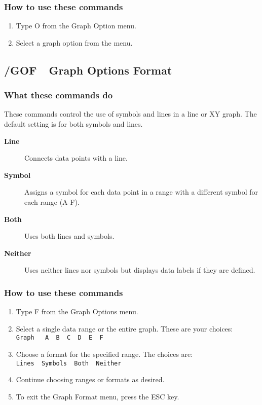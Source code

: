 \subsubsection*{How to use these commands}
\begin{enumerate}
\item{Type O from the Graph Option menu.}
\item{Select a graph option from the menu.}
\end{enumerate}
        
\subsection*{/GOF\ \     Graph Options Format}

\subsubsection*{What these commands do}
These commands control the use of symbols and lines in a line or XY 
graph.  The default setting is for both symbols and lines.
\begin{description}
\item[{\bf Line    }]{Connects data points with a line.}
\item[{\bf Symbol  }]{Assigns a symbol for each data point in a range
        with a different symbol for each range (A-F).}
\item[{\bf Both    }]{Uses both lines and symbols.}
\item[{\bf Neither }]{Uses neither lines nor symbols but displays data
        labels if they are defined.}
\end{description}
        
\subsubsection*{How to use these commands}
\begin{enumerate}
\item{Type F from the Graph Options menu.}
\item{Select a single data range or the entire graph.  These are your
        choices:\\
        {\tt Graph \ \ A\ \  B\ \  C\ \  D\ \  E\ \  F}  }
\item{Choose a format for the specified range.  The choices are:\\
        {\tt Lines\ \  Symbols\ \  Both\ \  Neither} }
\item{Continue choosing ranges or formats as desired.}
\item{To exit the Graph Format menu, press the ESC key.}
\end{enumerate}

